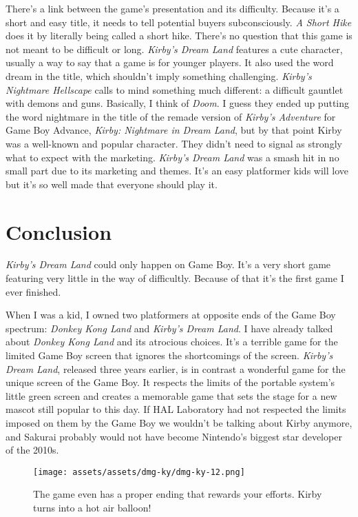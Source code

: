 \documentclass{book}
\begin{document}
There’s a link between the game’s presentation and its difficulty. Because it’s a short and easy title, it needs to tell potential buyers subconsciously. \emph{A Short Hike} does it by literally being called a short hike. There’s no question that this game is not meant to be difficult or long. \emph{Kirby’s Dream Land} features a cute character, usually a way to say that a game is for younger players. It also used the word dream in the title, which shouldn’t imply something challenging. \emph{Kirby’s Nightmare Hellscape} calls to mind something much different: a difficult gauntlet with demons and guns. Basically, I think of \emph{Doom}. I guess they ended up putting the word nightmare in the title of the remade version of \emph{Kirby’s Adventure} for Game Boy Advance, \emph{Kirby: Nightmare in Dream Land}, but by that point Kirby was a well-known and popular character. They didn’t need to signal as strongly what to expect with the marketing. \emph{Kirby’s Dream Land} was a smash hit in no small part due to its marketing and themes. It’s an easy platformer kids will love but it’s so well made that everyone should play it.

\FloatBarrier\needspace{5pt}\section*{Conclusion}\nopagebreak[4]

\emph{Kirby’s Dream Land} could only happen on Game Boy. It’s a very short game featuring very little in the way of difficultly. Because of that it’s the first game I ever finished.

When I was a kid, I owned two platformers at opposite ends of the Game Boy spectrum: \emph{Donkey Kong Land} and \emph{Kirby’s Dream Land}. I have already talked about \emph{Donkey Kong Land} and its atrocious choices. It’s a terrible game for the limited Game Boy screen that ignores the shortcomings of the screen. \emph{Kirby’s Dream Land}, released three years earlier, is in contrast a wonderful game for the unique screen of the Game Boy. It respects the limits of the portable system’s little green screen and creates a memorable game that sets the stage for a new mascot still popular to this day. If HAL Laboratory had not respected the limits imposed on them by the Game Boy we wouldn’t be talking about Kirby anymore, and Sakurai probably would not have become Nintendo’s biggest star developer of the 2010s.

\begin{figure}[hbt]
\vskip 10pt
\centering \texttt{[image: assets/assets/dmg-ky/dmg-ky-12.png]}\par\pagetwodescription The game even has a proper ending that rewards your efforts. Kirby turns into a hot air balloon!
\vskip 6pt
\end{figure}
\end{document}
